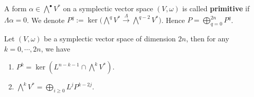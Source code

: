 \documentclass[
11pt, %
letterpaper， %
oneside, %
headinclude,footinclude, %
BCOR5mm, %
]{scrartcl}
\newcommand{\bfs}{\textbf}
\begin{document}
\begin{definition}
	A form $\alpha\in \bigwedge^{\bullet}V^*$ on a symplectic vector space $(V,\omega)$ is called \bfs{primitive} if $\Lambda \alpha =0$. We denote $P^q:=\ker\big(\bigwedge^q V^* \stackrel{\Lambda}{\longrightarrow} \bigwedge^{q-2} V^* \big)$. Hence $P=\bigoplus_{q=0}^{2n} P^q$.
\end{definition}

\begin{thm}Let $(V,\omega)$ be a symplectic vector space of dimension $2n$, then for any $k=0,\cdots, 2n$, we have
	\begin{enumerate}
		\item $P^k=\ker (L^{n-k-1} \cap \bigwedge^k V^*)$.
		\item $\bigwedge^k V^*=\bigoplus_{i\ge 0}L^jP^{k-2j}$.
	\end{enumerate}
\end{thm}
\end{document}
